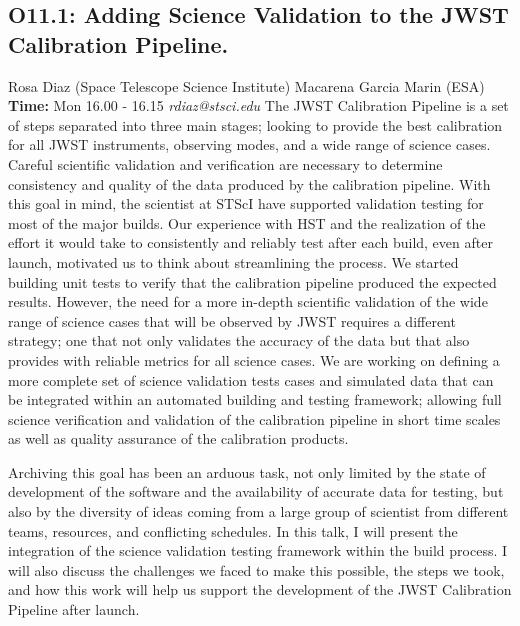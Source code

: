 \documentclass{report}
\begin{document}
\subsection*{O11.1: Adding Science Validation to the  JWST Calibration Pipeline.}
\bigskip
Rosa Diaz (Space Telescope Science Institute) \newline Macarena Garcia Marin (ESA) \newline   \newline   \newline  \newline  \newline\newline
{\bf Time:} Mon 16.00 - 16.15\newline
\newline
{\it rdiaz@stsci.edu}\newline
\newline\newline
The JWST Calibration Pipeline is a set of steps separated into three main stages; looking to provide the best calibration for all JWST instruments, observing modes, and a wide range of science cases. Careful scientific validation and verification are necessary to determine consistency and quality of the data produced by the calibration pipeline.  With this goal in mind, the scientist at STScI have supported validation testing for most of the major builds.  Our experience with HST and the realization of the effort it would take to consistently and reliably test after each build, even after launch, motivated us to think about streamlining the process.  We started building unit tests to verify that the calibration pipeline produced the expected results. However, the need for a more in-depth scientific validation of the wide range of science cases that will be observed by JWST requires a different strategy; one that not only validates the accuracy of the data but that also provides with reliable metrics for all science cases.  We are working on defining a more complete set of science validation tests cases and simulated data that can be integrated within an automated building and testing framework; allowing full science verification and validation of the calibration pipeline in short time scales as well as quality assurance of the calibration products. 

Archiving this goal has been an arduous task, not only limited by the state of development of the software and the availability of accurate data for testing, but also by the diversity of ideas coming from a large group of scientist from different teams, resources, and conflicting schedules. In this talk, I will present the integration of the science validation testing framework within the build process. I will also discuss the challenges we faced to make this possible, the steps we took, and how this work will help us support the development of the JWST Calibration Pipeline after launch.\newline
\newpage
\end{document}
